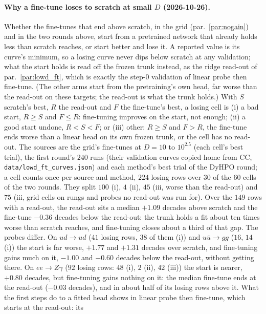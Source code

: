 \documentclass[11pt]{article}
\newcommand{\code}[1]{\texttt{#1}}
\begin{document}
\paragraph{Why a fine-tune loses to scratch at small $D$ (2026-10-26).}\label{par:ft_harm} Whether the fine-tunes that
end above scratch, in the grid (par.~\ref{par:nogain}) and in the two rounds above, start from a pretrained network that
already holds less than scratch reaches, or start better and lose it. A reported value is its curve's minimum, so a
losing curve never dips below scratch at any validation; what the start holds is read off the frozen trunk instead, as
the ridge read-out of par.~\ref{par:lowd_ft}, which is exactly the step-$0$ validation of linear probe then fine-tune.
(The other arms start from the pretraining's own head, far worse than the read-out on these targets; the read-out is
what the trunk holds.) With $S$ scratch's best, $R$ the read-out and $F$ the fine-tune's best, a losing cell is (i) a
bad start, $R\ge S$ and $F\le R$: fine-tuning improves on the start, not enough; (ii) a good start undone, $R<S<F$; or
(iii) other: $R\ge S$ and $F>R$, the fine-tune ends worse than a linear head on its own frozen trunk, or the cell has
no read-out. The sources are the grid's fine-tunes at $D=10$ to $10^{2.5}$ (each cell's best trial), the first round's
$240$ runs (their validation curves copied home from CC, \code{data/lowd\_ft\_curves.json}) and each method's best
trial of the DyHPO round; a cell counts once per source and method, $224$ losing rows over $30$ of the $60$ cells of
the two rounds. They split $100$ (i), $4$ (ii), $45$ (iii, worse than the read-out) and $75$ (iii, grid cells on rungs
and probes no read-out was run for). Over the $149$ rows with a read-out, the read-out sits a median $+1.09$ decades
above scratch and the fine-tune $-0.36$ decades below the read-out: the trunk holds a fit about ten times worse than
scratch reaches, and fine-tuning closes about a third of that gap. The probes differ. On $ud\to ud$ ($41$ losing rows,
$38$ of them (i)) and $u\bar u\to gg$ ($16$, $14$ (i)) the start is far worse, $+1.77$ and $+1.31$ decades over scratch,
and fine-tuning gains much on it, $-1.00$ and $-0.60$ decades below the read-out, without getting there. On $ee\to
Z\gamma$ ($92$ losing rows: $48$ (i), $2$ (ii), $42$ (iii)) the start is nearer, $+0.80$ decades, but fine-tuning gains
nothing on it: the median fine-tune ends at the read-out ($-0.03$ decades), and in about half of its losing rows above
it. What the first steps do to a fitted head shows in linear probe then fine-tune, which starts at the read-out: its
\end{document}
